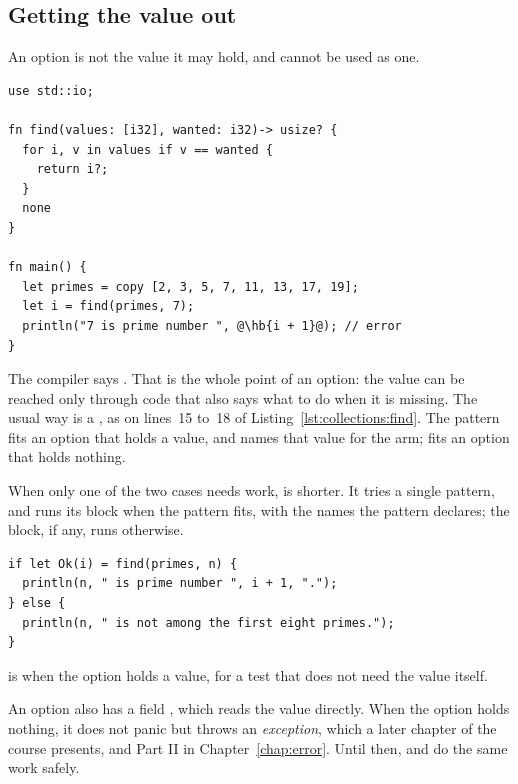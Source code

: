 \subsection{Getting the value out}

An option is not the value it may hold, and cannot be used as one.

\begin{lstlisting}[style=coloredverbatimError, escapechar=@, caption=An option used as a number]
use std::io;

fn find(values: [i32], wanted: i32)-> usize? {
  for i, v in values if v == wanted {
    return i?;
  }
  none
}

fn main() {
  let primes = copy [2, 3, 5, 7, 11, 13, 17, 19];
  let i = find(primes, 7);
  println("7 is prime number ", @\hb{i + 1}@); // error
}
\end{lstlisting}

The compiler says . That is the whole point of an option: the value can be reached only
through code that also says what to do when it is missing. The usual way is a
, as on lines~15 to~18 of Listing~\ref{lst:collections:find}. The
pattern  fits an option that holds a value, and names that value
 for the arm;  fits an option that holds nothing.

When only one of the two cases needs work,  is shorter. It tries a
single pattern, and runs its block when the pattern fits, with the names the
pattern declares; the  block, if any, runs otherwise.

\begin{lstlisting}[style=coloredverbatim]
if let Ok(i) = find(primes, n) {
  println(n, " is prime number ", i + 1, ".");
} else {
  println(n, " is not among the first eight primes.");
}
\end{lstlisting}

 is  when the option  holds a value, for
a test that does not need the value itself.

An option also has a field , which reads the value directly. When
the option holds nothing, it does not panic but throws an \textit{exception},
which a later chapter of the course presents, and Part II in
Chapter~\ref{chap:error}. Until then,  and  do the
same work safely.

